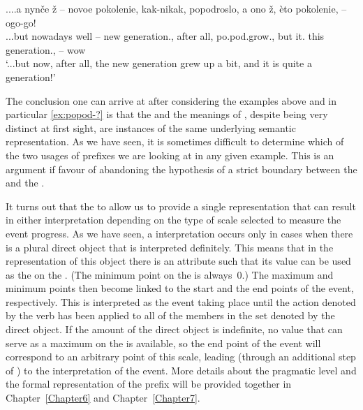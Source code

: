 \exg.\label{ex:popod-?}...a nyn\v{c}e \v{z} – novoe pokolenie, kak-nikak, popodroslo, a ono \v{z}, \`{e}to pokolenie, -- ogo-go!\\
...but nowadays well -- new generation., {after all}, po.pod.grow., but it. {} this generation., -- wow
\\
\trans `...but now, after all, the new generation grew up a bit, and it is quite a generation!'
 
The conclusion one can arrive at after considering the examples above and in particular \ref{ex:popod-?} is that the  and the  meanings of , despite being very distinct at first sight, are instances of the same underlying semantic representation. As we have seen, it is sometimes difficult to determine which of the two usages of prefixes we are looking at in any given example. This is an argument if favour of abandoning the hypothesis of a strict boundary between the   and the  .

It turns out that the  to  allow us to provide a single representation that can result in either interpretation depending on the type of scale selected to measure the event progress. As we have seen, a  interpretation occurs only in cases when there is a plural direct object that is interpreted definitely. This means that in the representation of this object there is an attribute such that its value can be used as the  on the . (The minimum point on the  is always~0.) The maximum and minimum points then become linked to the start and the end points of the event, respectively. This is interpreted as the event taking place until the action denoted by the verb has been applied to all of the members in the set denoted by the direct object. If the amount of the direct object is indefinite, no value that can serve as a maximum on the  is available, so the end point of the event will correspond to an arbitrary point of this scale, leading (through an additional step of ) to the  interpretation of the event. More details about the pragmatic level and the formal representation of the prefix will be provided together in Chapter~\ref{Chapter6} and Chapter~\ref{Chapter7}.

